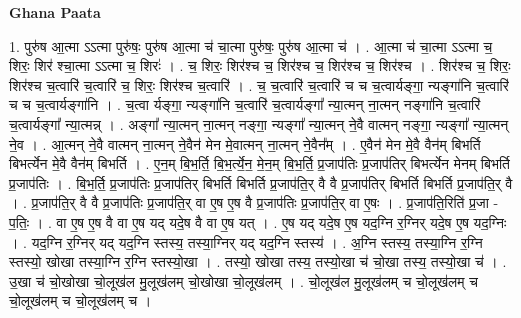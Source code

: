 \documentclass[17pt]{extarticle}
\begin{document}
\textbf{Ghana Paata } \newline

1. पुरु॑ष आ॒त्मा ऽऽत्मा पुरु॑षः॒ पुरु॑ष आ॒त्मा च॑ चा॒त्मा पुरु॑षः॒ पुरु॑ष आ॒त्मा च॑ । . आ॒त्मा च॑ चा॒त्मा ऽऽत्मा च॒ शिरः॒ शिर॑ श्चा॒त्मा ऽऽत्मा च॒ शिरः॑ । . च॒ शिरः॒ शिर॑श्च च॒ शिर॑श्च च॒ शिर॑श्च च॒ शिर॑श्च । . शिर॑श्च च॒ शिरः॒ शिर॑श्च च॒त्वारि॑ च॒त्वारि॑ च॒ शिरः॒ शिर॑श्च च॒त्वारि॑ । . च॒ च॒त्वारि॑ च॒त्वारि॑ च च च॒त्वार्यङ्गा॒ न्यङ्गा॑नि च॒त्वारि॑ च च च॒त्वार्यङ्गा॑नि । . च॒त्वा र्यङ्गा॒ न्यङ्गा॑नि च॒त्वारि॑ च॒त्वार्यङ्गा᳚ न्या॒त्मन् ना॒त्मन् नङ्गा॑नि च॒त्वारि॑ च॒त्वार्यङ्गा᳚ न्या॒त्मन्न् । . अङ्गा᳚ न्या॒त्मन् ना॒त्मन् नङ्गा॒ न्यङ्गा᳚ न्या॒त्मन् ने॒वै वात्मन् नङ्गा॒ न्यङ्गा᳚ न्या॒त्मन् ने॒व । . आ॒त्मन् ने॒वै वात्मन् ना॒त्मन् ने॒वैन॑ मेन मे॒वात्मन् ना॒त्मन् ने॒वैन᳚म् । . ए॒वैन॑ मेन मे॒वै वैन॑म् बिभर्ति बिभर्त्येन मे॒वै वैन॑म् बिभर्ति । . ए॒न॒म् बि॒भ॒र्ति॒ बि॒भ॒र्त्ये॒न॒ मे॒न॒म् बि॒भ॒र्ति॒ प्र॒जाप॑तिः प्र॒जाप॑तिर् बिभर्त्येन मेनम् बिभर्ति प्र॒जाप॑तिः । . बि॒भ॒र्ति॒ प्र॒जाप॑तिः प्र॒जाप॑तिर् बिभर्ति बिभर्ति प्र॒जाप॑ति॒र् वै वै प्र॒जाप॑तिर् बिभर्ति बिभर्ति प्र॒जाप॑ति॒र् वै । . प्र॒जाप॑ति॒र् वै वै प्र॒जाप॑तिः प्र॒जाप॑ति॒र् वा ए॒ष ए॒ष वै प्र॒जाप॑तिः प्र॒जाप॑ति॒र् वा ए॒षः । . प्र॒जाप॑ति॒रिति॑ प्र॒जा - प॒तिः॒ । . वा ए॒ष ए॒ष वै वा ए॒ष यद् यदे॒ष वै वा ए॒ष यत् । . ए॒ष यद् यदे॒ष ए॒ष यद॒ग्नि र॒ग्निर् यदे॒ष ए॒ष यद॒ग्निः । . यद॒ग्नि र॒ग्निर् यद् यद॒ग्नि स्तस्य॒ तस्या॒ग्निर् यद् यद॒ग्नि स्तस्य॑ । . अ॒ग्नि स्तस्य॒ तस्या॒ग्नि र॒ग्नि स्तस्यो॒ खोखा तस्या॒ग्नि र॒ग्नि स्तस्यो॒खा । . तस्यो॒ खोखा तस्य॒ तस्यो॒खा च॑ चो॒खा तस्य॒ तस्यो॒खा च॑ । . उ॒खा च॑ चो॒खोखा चो॒लूख॑ल मु॒लूख॑लम् चो॒खोखा चो॒लूख॑लम् । . चो॒लूख॑ल मु॒लूख॑लम् च चो॒लूख॑लम् च चो॒लूख॑लम् च चो॒लूख॑लम् च । \newline
\end{document}
